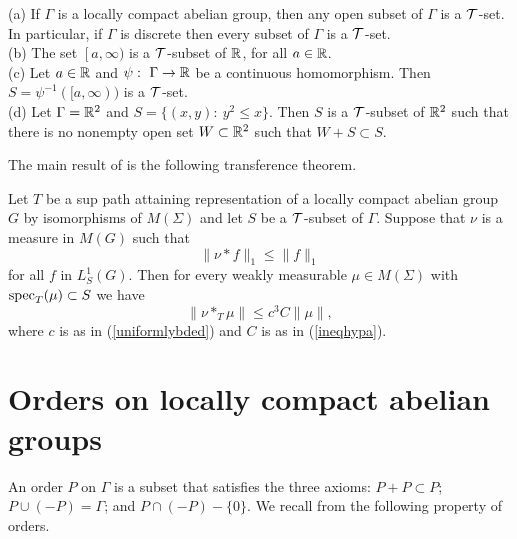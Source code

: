 \documentclass[12pt,leqno]{article}
\def\R{\Bbb R}
\def\cT{{\cal T}}
\begin{document}
\begin{ex}\label{s-set}
{\rm (a)  If $\Gamma$ is a locally compact abelian group, then any open subset of $\Gamma$ is a $\cT$-set.  In particular, if $\Gamma$ is discrete then every subset of $\Gamma$ is a $\cT$-set.\\
(b)  The set $\left[ a,\infty\right. )$ is a $\cT$-subset of $\R$, for all $a\in\R$.  \\
(c)  Let $a\in\R$ and $\psi:\ \Gamma \rightarrow \R$ be a continuous homomorphism.  Then 
$S=\psi^{-1}([a,\infty))$ is a $\cT$-set.\\
(d)  Let $\Gamma=\R^2$ and $S=\{(x,y):\ y^2\leq x\}$.  
Then $S$ is a $\cT$-subset of $\R^2$ such that there is no nonempty open set $W\subset \R^2$ such that $W+S\subset S$. 
}
\end{ex}

The main result of \cite{amss} is the following transference
theorem.
\begin{thm}
Let $T$ be a sup path attaining representation of a locally compact abelian group
$G$ by isomorphisms of $M(\Sigma)$ and let $S$ be a $\cT$-subset of
$\Gamma$.
Suppose that $\nu$ is a measure in $M(G)$ such that
\begin{equation}
\|\nu*f\|_1\leq \|f\|_1
\label{hyptransference2}
\end{equation}
for all $f$ in $L_S^1(G)$.  Then for every 
weakly measurable $\mu \in M(\Sigma)$ with
${\rm spec}_T ( \mu )\subset S$
we have
\begin{equation}
\|\nu*_T\mu\|\leq c^3 C \|\mu\|,
\end{equation}
where $c$ is as in (\ref{uniformlybded}) and 
$C$ is as in (\ref{ineqhypa}).
\label{trans-thm}
\end{thm}





\section{Orders on locally compact abelian groups}


An order $P$ on $\Gamma$ is a subset
that satisfies the three axioms:
$P+P\subset P$; $P\cup (-P)=\Gamma$; and $P\cap (-P)-\{0\}$.
We recall from \cite{ams} the following property of orders. 
\end{document}

